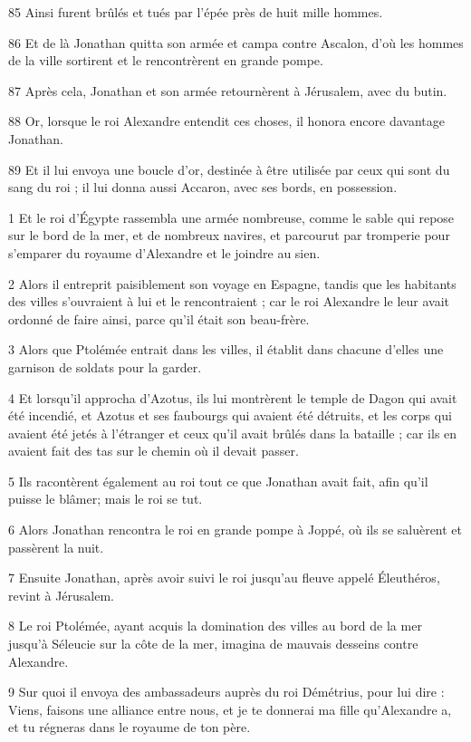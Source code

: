 \par 85 Ainsi furent brûlés et tués par l'épée près de huit mille hommes.
\par 86 Et de là Jonathan quitta son armée et campa contre Ascalon, d'où les hommes de la ville sortirent et le rencontrèrent en grande pompe.
\par 87 Après cela, Jonathan et son armée retournèrent à Jérusalem, avec du butin.
\par 88 Or, lorsque le roi Alexandre entendit ces choses, il honora encore davantage Jonathan.
\par 89 Et il lui envoya une boucle d'or, destinée à être utilisée par ceux qui sont du sang du roi ; il lui donna aussi Accaron, avec ses bords, en possession.


\par 1 Et le roi d'Égypte rassembla une armée nombreuse, comme le sable qui repose sur le bord de la mer, et de nombreux navires, et parcourut par tromperie pour s'emparer du royaume d'Alexandre et le joindre au sien.
\par 2 Alors il entreprit paisiblement son voyage en Espagne, tandis que les habitants des villes s'ouvraient à lui et le rencontraient ; car le roi Alexandre le leur avait ordonné de faire ainsi, parce qu'il était son beau-frère.
\par 3 Alors que Ptolémée entrait dans les villes, il établit dans chacune d'elles une garnison de soldats pour la garder.
\par 4 Et lorsqu'il approcha d'Azotus, ils lui montrèrent le temple de Dagon qui avait été incendié, et Azotus et ses faubourgs qui avaient été détruits, et les corps qui avaient été jetés à l'étranger et ceux qu'il avait brûlés dans la bataille ; car ils en avaient fait des tas sur le chemin où il devait passer.
\par 5 Ils racontèrent également au roi tout ce que Jonathan avait fait, afin qu'il puisse le blâmer; mais le roi se tut.
\par 6 Alors Jonathan rencontra le roi en grande pompe à Joppé, où ils se saluèrent et passèrent la nuit.
\par 7 Ensuite Jonathan, après avoir suivi le roi jusqu'au fleuve appelé Éleuthéros, revint à Jérusalem.
\par 8 Le roi Ptolémée, ayant acquis la domination des villes au bord de la mer jusqu'à Séleucie sur la côte de la mer, imagina de mauvais desseins contre Alexandre.
\par 9 Sur quoi il envoya des ambassadeurs auprès du roi Démétrius, pour lui dire : Viens, faisons une alliance entre nous, et je te donnerai ma fille qu'Alexandre a, et tu régneras dans le royaume de ton père.
